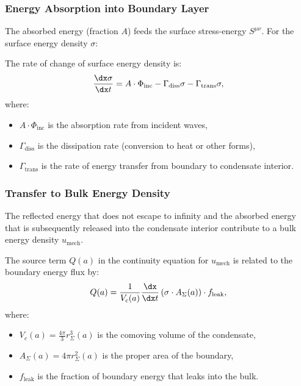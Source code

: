 \subsubsection{Energy Absorption into Boundary Layer}

The absorbed energy (fraction $A$) feeds the surface stress-energy $S^{\mu\nu}$. For the surface energy density $\sigma$:

\begin{proposition}
\label{prop:surface_accumulation}
The rate of change of surface energy density is:
\begin{equation}
\label{eq:surface_accumulation}
\frac{\dx \sigma}{\dx t} = A \cdot \Phi_{\text{inc}} - \Gamma_{\text{diss}} \sigma - \Gamma_{\text{trans}} \sigma,
\end{equation}
where:
\begin{itemize}
    \item $A \cdot \Phi_{\text{inc}}$ is the absorption rate from incident waves,
    \item $\Gamma_{\text{diss}}$ is the dissipation rate (conversion to heat or other forms),
    \item $\Gamma_{\text{trans}}$ is the rate of energy transfer from boundary to condensate interior.
\end{itemize}
\end{proposition}

\subsubsection{Transfer to Bulk Energy Density}

The reflected energy that does not escape to infinity and the absorbed energy that is subsequently released into the condensate interior contribute to a bulk energy density $u_{\text{mech}}$.

\begin{proposition}
\label{prop:bulk_source}
The source term $Q(a)$ in the continuity equation for $u_{\text{mech}}$ is related to the boundary energy flux by:
\begin{equation}
\label{eq:Q_source}
Q(a) = \frac{1}{V_c(a)} \frac{\dx}{\dx t} \left( \sigma \cdot A_\Sigma(a) \right) \cdot f_{\text{leak}},
\end{equation}
where:
\begin{itemize}
    \item $V_c(a) = \frac{4\pi}{3} r_\Sigma^3(a)$ is the comoving volume of the condensate,
    \item $A_\Sigma(a) = 4\pi r_\Sigma^2(a)$ is the proper area of the boundary,
    \item $f_{\text{leak}}$ is the fraction of boundary energy that leaks into the bulk.
\end{itemize}
\end{proposition}


